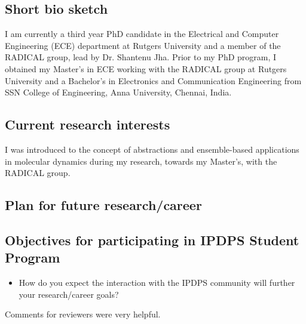 \subsection{Short bio sketch}
I am currently a third year PhD candidate in the Electrical and Computer 
Engineering (ECE) department at Rutgers University and a member of the RADICAL
group, lead by Dr. Shantenu Jha. Prior to my PhD program, I obtained my Master's
in ECE working with the RADICAL group at Rutgers University and a Bachelor's in 
Electronics and Communication Engineering from SSN College of Engineering, Anna
University, Chennai, India.


\subsection{Current research interests}
I was introduced to the concept of abstractions and ensemble-based applications 
in molecular dynamics during my research, towards my Master's, with the RADICAL 
group.



\subsection{Plan for future research/career}



\subsection{Objectives for participating in IPDPS Student Program}

\begin{itemize}
\item How do you expect the interaction with the IPDPS community will further 
your research/career goals?
\end{itemize}

Comments for reviewers were very helpful.